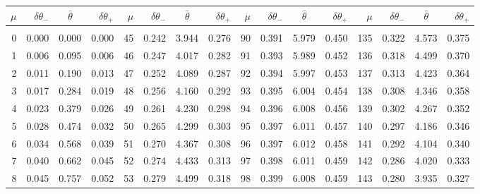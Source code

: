 \newpage
\begin{table}\centering
\small{ \begin{tabular}{rrrr|rrrr|rrrr|rrrr}
$\mu$ & $\delta\theta_-$  & $\bar{\theta}~~~~$ & $\delta\theta_+$ &
$\mu$ & $\delta\theta_-$  & $\bar{\theta}~~~~$ & $\delta\theta_+$ &
$\mu$ & $\delta\theta_-$  & $\bar{\theta}~~~~$ & $\delta\theta_+$ &
$\mu$ & $\delta\theta_-$  & $\bar{\theta}~~~~$ & $\delta\theta_+$ \\\hline
&&&&&&&&&&&&&&&\\[-1.75ex]
  0 & \tiny{  0.000} &   0.000 & \tiny{  0.000} &  45 & \tiny{  0.242} &   3.944 & \tiny{  0.276} &  90 & \tiny{  0.391} &   5.979 & \tiny{  0.450} & 135 & \tiny{  0.322} &   4.573 & \tiny{  0.375}\\
  1 & \tiny{  0.006} &   0.095 & \tiny{  0.006} &  46 & \tiny{  0.247} &   4.017 & \tiny{  0.282} &  91 & \tiny{  0.393} &   5.989 & \tiny{  0.452} & 136 & \tiny{  0.318} &   4.499 & \tiny{  0.370}\\
  2 & \tiny{  0.011} &   0.190 & \tiny{  0.013} &  47 & \tiny{  0.252} &   4.089 & \tiny{  0.287} &  92 & \tiny{  0.394} &   5.997 & \tiny{  0.453} & 137 & \tiny{  0.313} &   4.423 & \tiny{  0.364}\\
  3 & \tiny{  0.017} &   0.284 & \tiny{  0.019} &  48 & \tiny{  0.256} &   4.160 & \tiny{  0.292} &  93 & \tiny{  0.395} &   6.004 & \tiny{  0.454} & 138 & \tiny{  0.308} &   4.346 & \tiny{  0.358}\\
  4 & \tiny{  0.023} &   0.379 & \tiny{  0.026} &  49 & \tiny{  0.261} &   4.230 & \tiny{  0.298} &  94 & \tiny{  0.396} &   6.008 & \tiny{  0.456} & 139 & \tiny{  0.302} &   4.267 & \tiny{  0.352}\\
  5 & \tiny{  0.028} &   0.474 & \tiny{  0.032} &  50 & \tiny{  0.265} &   4.299 & \tiny{  0.303} &  95 & \tiny{  0.397} &   6.011 & \tiny{  0.457} & 140 & \tiny{  0.297} &   4.186 & \tiny{  0.346}\\
  6 & \tiny{  0.034} &   0.568 & \tiny{  0.039} &  51 & \tiny{  0.270} &   4.367 & \tiny{  0.308} &  96 & \tiny{  0.397} &   6.012 & \tiny{  0.458} & 141 & \tiny{  0.292} &   4.104 & \tiny{  0.340}\\
  7 & \tiny{  0.040} &   0.662 & \tiny{  0.045} &  52 & \tiny{  0.274} &   4.433 & \tiny{  0.313} &  97 & \tiny{  0.398} &   6.011 & \tiny{  0.459} & 142 & \tiny{  0.286} &   4.020 & \tiny{  0.333}\\
  8 & \tiny{  0.045} &   0.757 & \tiny{  0.052} &  53 & \tiny{  0.279} &   4.499 & \tiny{  0.318} &  98 & \tiny{  0.399} &   6.008 & \tiny{  0.459} & 143 & \tiny{  0.280} &   3.935 & \tiny{  0.327}\\

\end{tabular}}
\end{table}

